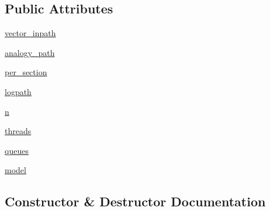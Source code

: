 \subsection*{Public Attributes}
\begin{DoxyCompactItemize}
\item 
\hyperlink{classsrc_1_1eval_1_1analogy_1_1_analogy_master_thread_a581000df6b13c7b2d3a06a56097972f0}{vector\+\_\+inpath}
\item 
\hyperlink{classsrc_1_1eval_1_1analogy_1_1_analogy_master_thread_aa76e56284b44372302314cbd82acedd0}{analogy\+\_\+path}
\item 
\hyperlink{classsrc_1_1eval_1_1analogy_1_1_analogy_master_thread_a32028e35b91d6f3b1338aed361a9b608}{per\+\_\+section}
\item 
\hyperlink{classsrc_1_1eval_1_1analogy_1_1_analogy_master_thread_a7ef0cbb224a26fc5ccd20887e0d039d4}{logpath}
\item 
\hyperlink{classsrc_1_1eval_1_1analogy_1_1_analogy_master_thread_a5a42ba2f5b1620a230e19597d3e2492b}{n}
\item 
\hyperlink{classsrc_1_1eval_1_1analogy_1_1_analogy_master_thread_a093ad956946c45477e62df9e95460128}{threads}
\item 
\hyperlink{classsrc_1_1eval_1_1analogy_1_1_analogy_master_thread_a9d2e9c082fe78faf02948e0a0b357c21}{queues}
\item 
\hyperlink{classsrc_1_1eval_1_1analogy_1_1_analogy_master_thread_ac6084419ab7972b1ffc22a3756db3803}{model}
\end{DoxyCompactItemize}


\subsection{Constructor \& Destructor Documentation}
